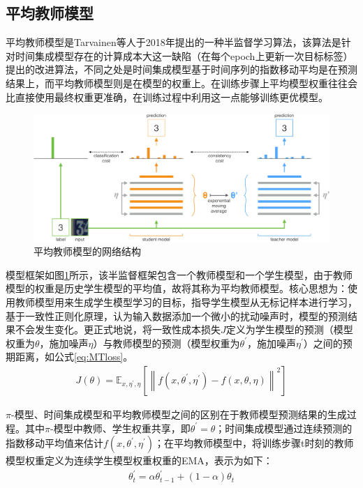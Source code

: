 \documentclass[lang=chs, degree=master, blindreview=false, adobe=false]{yanputhesis}
\begin{document}
\subsection{平均教师模型}
平均教师模型是Tarvainen等人\cite{Tarvainen2017teacher}于2018年提出的一种半监督学习算法，该算法是针对时间集成模型存在的计算成本大这一缺陷（在每个epoch上更新一次目标标签）提出的改进算法，不同之处是时间集成模型基于时间序列的指数移动平均是在预测结果上，而平均教师模型则是在模型的权重上。在训练步骤上平均模型权重往往会比直接使用最终权重更准确，在训练过程中利用这一点能够训练更优模型。
\begin{figure}[htb]
  \centering
  \includegraphics[scale=0.3]{images/mean-teacher.png}
  \caption{
    平均教师模型的网络结构\cite{Tarvainen2017teacher}
  }
  \label{fig:MTfram}
\end{figure}

模型框架如图\ref{fig:MTfram}所示，该半监督框架包含一个教师模型和一个学生模型，由于教师模型的权重是历史学生模型的平均值，故将其称为平均教师模型。核心思想为：使用教师模型用来生成学生模型学习的目标，指导学生模型从无标记样本进行学习，基于一致性正则化原理，认为输入数据添加一个微小的扰动噪声时，模型的预测结果不会发生变化。更正式地说，将一致性成本损失$J$定义为学生模型的预测（模型权重为$\theta$，施加噪声$\eta$）与教师模型的预测（模型权重为$\theta^{\prime}$，施加噪声$\eta^{\prime}$）之间的预期距离，如公式\ref{eq:MTloss}。
\begin{equation}
  \label{eq:MTloss}
  \begin{aligned}
    J(\theta)=\mathbb{E}_{x, \eta^{\prime}, \eta}\left[\left\|f\left(x, \theta^{\prime}, \eta^{\prime}\right)-f(x, \theta, \eta)\right\|^{2}\right]
    \end{aligned}
\end{equation}

$\pi$-模型、时间集成模型和平均教师模型之间的区别在于教师模型预测结果的生成过程。其中$\pi$-模型中教师、学生权重共享，即$\theta^{\prime} = \theta$；时间集成模型通过连续预测的指数移动平均值来估计$f\left(x, \theta^{\prime}, \eta^{\prime}\right)$；在平均教师模型中，将训练步骤t时刻的教师模型权重定义为连续学生模型权重权重的EMA，表示为如下：
\begin{equation}
  \label{eq:MTema}
  \begin{aligned}
    \theta_{t}^{\prime}=\alpha \theta_{t-1}^{\prime}+(1-\alpha) \theta_{t}
    \end{aligned}
\end{equation}
\end{document}
